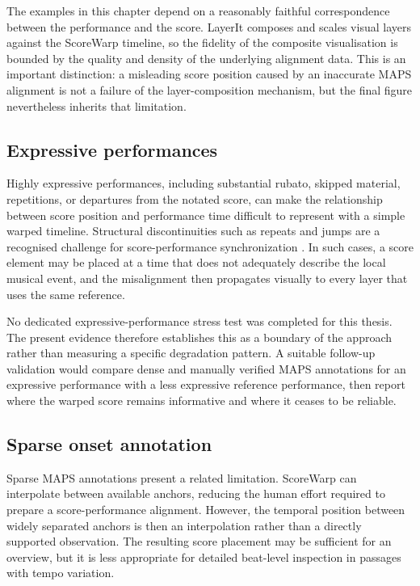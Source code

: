 The examples in this chapter depend on a reasonably faithful correspondence between the performance and the score. LayerIt composes and scales visual layers against the ScoreWarp timeline, so the fidelity of the composite visualisation is bounded by the quality and density of the underlying alignment data. This is an important distinction: a misleading score position caused by an inaccurate MAPS alignment is not a failure of the layer-composition mechanism, but the final figure nevertheless inherits that limitation.

\subsection{Expressive performances}

Highly expressive performances, including substantial rubato, skipped material, repetitions, or departures from the notated score, can make the relationship between score position and performance time difficult to represent with a simple warped timeline. Structural discontinuities such as repeats and jumps are a recognised challenge for score-performance synchronization \cite{thomasLinkingSheetMusic2012,fremereyHandlingRepeats2010}. In such cases, a score element may be placed at a time that does not adequately describe the local musical event, and the misalignment then propagates visually to every layer that uses the same reference.

No dedicated expressive-performance stress test was completed for this thesis. The present evidence therefore establishes this as a boundary of the approach rather than measuring a specific degradation pattern. A suitable follow-up validation would compare dense and manually verified MAPS annotations for an expressive performance with a less expressive reference performance, then report where the warped score remains informative and where it ceases to be reliable.

\subsection{Sparse onset annotation}

Sparse MAPS annotations present a related limitation. ScoreWarp can interpolate between available anchors, reducing the human effort required to prepare a score-performance alignment. However, the temporal position between widely separated anchors is then an interpolation rather than a directly supported observation. The resulting score placement may be sufficient for an overview, but it is less appropriate for detailed beat-level inspection in passages with tempo variation.

